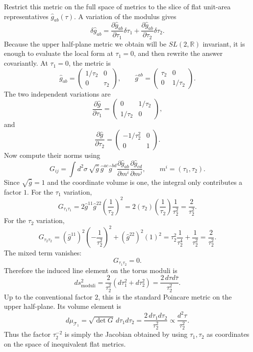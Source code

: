 \documentclass[
  10pt,
  a4paper,
  openany]{book}
\begin{document}
Restrict this metric on the full space of metrics to the slice of flat
unit-area representatives \(\hat g_{ab}(\tau)\). A variation of the
modulus gives \[
\delta \hat g_{ab}
=
\frac{\partial \hat g_{ab}}{\partial \tau_1}\delta\tau_1
+
\frac{\partial \hat g_{ab}}{\partial \tau_2}\delta\tau_2.
\] Because the upper half-plane metric we obtain will be
\(SL(2,\mathbb R)\) invariant, it is enough to evaluate the local form
at \(\tau_1=0\), and then rewrite the answer covariantly. At
\(\tau_1=0\), the metric is \[
\hat g_{ab}
=
\begin{pmatrix}
1/\tau_2 & 0\\
0 & \tau_2
\end{pmatrix},
\qquad
\hat g^{ab}
=
\begin{pmatrix}
\tau_2 & 0\\
0 & 1/\tau_2
\end{pmatrix}.
\] The two independent variations are \[
\frac{\partial \hat g}{\partial \tau_1}
=
\begin{pmatrix}
0 & 1/\tau_2\\
1/\tau_2 & 0
\end{pmatrix},
\] and \[
\frac{\partial \hat g}{\partial \tau_2}
=
\begin{pmatrix}
-1/\tau_2^2 & 0\\
0 & 1
\end{pmatrix}.
\] Now compute their norms using \[
G_{ij}
=
\int d^2\sigma\,\sqrt{\hat g}\,
\hat g^{ac}\hat g^{bd}
\frac{\partial \hat g_{ab}}{\partial m^i}
\frac{\partial \hat g_{cd}}{\partial m^j},
\qquad
m^i=(\tau_1,\tau_2).
\] Since \(\sqrt{\hat g}=1\) and the coordinate volume is one, the
integral only contributes a factor \(1\). For the \(\tau_1\) variation,
\[
G_{\tau_1\tau_1}
=
2\hat g^{11}\hat g^{22}
\left(\frac{1}{\tau_2}\right)^2
=
2\left(\tau_2\right)\left(\frac{1}{\tau_2}\right)\frac{1}{\tau_2^2}
=
\frac{2}{\tau_2^2}.
\] For the \(\tau_2\) variation, \[
G_{\tau_2\tau_2}
=
(\hat g^{11})^2\left(-\frac{1}{\tau_2^2}\right)^2
+
(\hat g^{22})^2(1)^2
=
\tau_2^2\frac{1}{\tau_2^4}
+
\frac{1}{\tau_2^2}
=
\frac{2}{\tau_2^2}.
\] The mixed term vanishes: \[
G_{\tau_1\tau_2}=0.
\] Therefore the induced line element on the torus moduli is \[
ds^2_{\mathrm{moduli}}
=
\frac{2}{\tau_2^2}
\left(d\tau_1^2+d\tau_2^2\right)
=
\frac{2\,d\tau d\bar\tau}{\tau_2^2}.
\] Up to the conventional factor \(2\), this is the standard Poincare
metric on the upper half-plane. Its volume element is \[
d\mu_{\mathcal T_1}
=
\sqrt{\det G}\,d\tau_1d\tau_2
=
\frac{2\,d\tau_1d\tau_2}{\tau_2^2}
\propto
\frac{d^2\tau}{\tau_2^2}.
\] Thus the factor \(\tau_2^{-2}\) is simply the Jacobian obtained by
using \(\tau_1,\tau_2\) as coordinates on the space of inequivalent flat
metrics.
\end{document}
